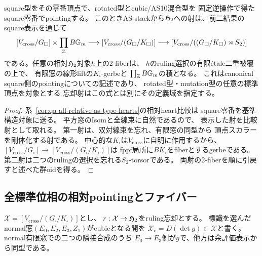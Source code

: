 \begin{corollary}
\label{cor:qa-all-relative-as-canonical-h2-fiber}
square型をその零番頂点で、rotated型とcubic/AS10混合型を
固定逆操作で得たsquare零番でpointingする。
このときAS stackから$\mathfrak H_2$への射は、前二結果の
square表示を通じて
\[
 [V_{\mathrm{cross}}/G_\square]\times\prod_{\mathbb Z}B\mathbb G_m
 \longrightarrow
 [V_{\mathrm{cross}}/(G_\square/K_\square)]
 \longrightarrow
 [V_{\mathrm{cross}}/((G_\square/K_\square)\rtimes S_2)]
\]
である。任意の相対$\mathfrak H_2$対象$h$上の2-fiberは、
$h$のruling選択の有限\'etale二重被覆の上で、
有限窓の線形liftの$K_\square$-gerbeと
$\prod_{\mathbb Z}B\mathbb G_m$の積となる。
これはcanonical square側のpointingについての記述であり、
rotated型・mutation型の任意の標準頂点を対象とする
忘却射はこの式とは別にその定義域を指定する。
\end{corollary}
\begin{proof}
系~\ref{cor:qa-all-relative-as-type-hearts}の相対heart比較は
square零番を基準構造対象に送る。
平方窓のIsomと全線束に自然であるので、
表示した射を比較射として取れる。
第一射は、双対線束を忘れ、有限窓の同型から
頂点スカラーを剛体化する射である。
中心的な$K_\square$は$V_{\mathrm{cross}}$に自明に作用するから、
$[V_{\mathrm{cross}}/G_\square]\to
 [V_{\mathrm{cross}}/(G_\square/K_\square)]$は
fppf局所に$BK_\square$をfiberとするgerbeである。
第二射は二つのrulingの選択を忘れる$S_2$-torsorである。
両射の2-fiberを順に引戻すと述べた群oidを得る。
\end{proof}

\subsection{全標準位相の相対pointingとファイバー}
\label{subsec:qa-all-relative-as-pointings}

$\mathcal X=[V_{\mathrm{cross}}/(G_\square/K_\square)]$とし、
$r:\mathcal X\to\mathfrak H_2$をruling忘却とする。
標識を選んだnormal窓$(E_0,E_2,E_3,Z_1)$がcubicとなる開を
$\mathcal X_{\mathrm c}=D(\det g)\subset\mathcal X$と書く。
normal有限窓での二つの隣接合成のうち
$E_0\to E_3$側が$g$で、他方は余評価表示から同型である。

